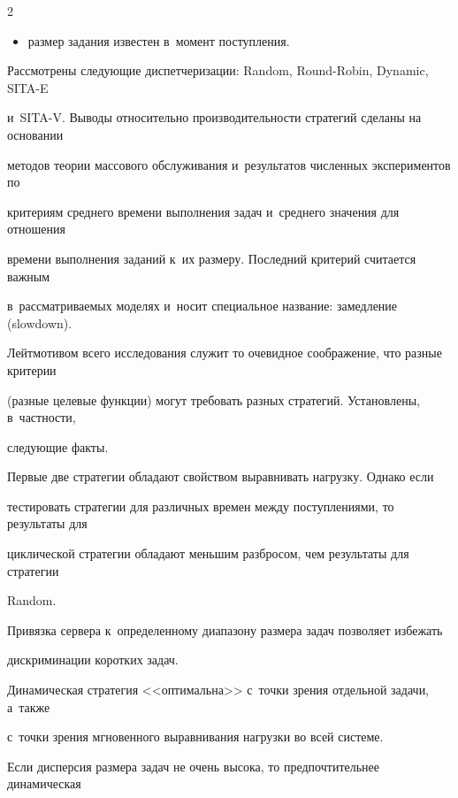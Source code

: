 \begin{multicols}{2}
\begin{itemize}
    $$


    \item  размер задания известен в~момент поступления.


    \end{itemize}


    


    Рассмотрены следующие диспетчеризации: Random, Round-Robin, Dynamic, SITA-E 


и~SITA-V. Выводы относительно производительности стра\-тегий сделаны на основании 


методов теории мас\-сового обслуживания и~результатов численных эксперимен\-тов по 


критериям среднего времени выполнения задач и~среднего значения для отношения 


времени выполнения заданий к~их размеру. По\-следний критерий считается важным 


в~рас\-смат\-ри\-ва\-емых моделях и~носит специальное название: замедление (slowdown). 


Лейтмотивом всего исследования служит то очевидное соображение, что разные критерии 


(разные целевые функции) могут требовать разных стратегий. Установлены, в~частности, 


следующие факты.


    


    Первые две стратегии обладают свойством выравнивать нагрузку. Однако если 


тестировать стратегии для различных времен между поступлениями, то результаты для 


циклической стратегии обладают меньшим разбросом, чем результаты для стратегии 


Random.


    


    Привязка сервера к~определенному диапазону размера задач позволяет избежать 


дискриминации коротких задач. 




    Динамическая стратегия <<оптимальна>> с~точки зрения отдельной задачи, а~также 


с~точки зрения мгновенного выравнивания нагрузки во всей сис\-теме.




    Если дисперсия размера задач не очень высока, то предпочтительнее динамическая 



\end{multicols}
